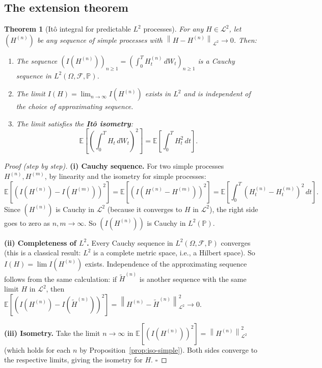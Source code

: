 \documentclass[11pt,a4paper]{article}
\theoremstyle{definition}
\theoremstyle{plain}
\newtheorem{theorem}{Theorem}[section]
\theoremstyle{remark}
\newcommand{\E}{\mathbb{E}}
\newcommand{\Prob}{\mathbb{P}}
\newcommand{\F}{\mathcal{F}}
\newcommand{\calL}{\mathcal{L}}
\newcommand{\norm}[1]{\left\|#1\right\|}
\begin{document}
\subsection{The extension theorem}

\begin{theorem}[Itô integral for predictable $L^2$ processes]
\label{thm:main-extension}
For any $H \in \calL^2$, let $(H^{(n)})$ be any sequence of simple processes with $\norm{H - H^{(n)}}_{\calL^2} \to 0$. Then:
\begin{enumerate}[label=(\roman*)]
  \item The sequence $\left(I(H^{(n)})\right)_{n\geq 1} = \left(\int_0^T H_t^{(n)}\,dW_t\right)_{n\geq 1}$ is a Cauchy sequence in $L^2(\Omega, \F, \Prob)$.
  \item The limit $I(H) = \lim_{n\to\infty} I(H^{(n)})$ exists in $L^2$ and is independent of the choice of approximating sequence.
  \item The limit satisfies the \textbf{Itô isometry}:
  \[
    \E\left[\left(\int_0^T H_t\,dW_t\right)^2\right] = \E\left[\int_0^T H_t^2\,dt\right].
  \]
\end{enumerate}
\end{theorem}

\begin{proof}[Proof (step by step)]
\textbf{(i) Cauchy sequence.}
For two simple processes $H^{(n)}, H^{(m)}$, by linearity and the isometry for simple processes:
\[
  \E\left[\left(I(H^{(n)}) - I(H^{(m)})\right)^2\right] = \E\left[\left(I(H^{(n)} - H^{(m)})\right)^2\right] = \E\left[\int_0^T (H_t^{(n)} - H_t^{(m)})^2\,dt\right].
\]
Since $(H^{(n)})$ is Cauchy in $\calL^2$ (because it converges to $H$ in $\calL^2$), the right side goes to zero as $n, m \to \infty$. So $(I(H^{(n)}))$ is Cauchy in $L^2(\Prob)$.

\textbf{(ii) Completeness of $L^2$.}
Every Cauchy sequence in $L^2(\Omega, \F, \Prob)$ converges (this is a classical result: $L^2$ is a complete metric space, i.e., a Hilbert space). So $I(H) = \lim I(H^{(n)})$ exists. Independence of the approximating sequence follows from the same calculation: if $\tilde{H}^{(n)}$ is another sequence with the same limit $H$ in $\calL^2$, then $\E[(I(H^{(n)}) - I(\tilde{H}^{(n)}))^2] = \norm{H^{(n)} - \tilde{H}^{(n)}}_{\calL^2}^2 \to 0$.

\textbf{(iii) Isometry.}
Take the limit $n \to \infty$ in $\E[(I(H^{(n)}))^2] = \norm{H^{(n)}}_{\calL^2}^2$ (which holds for each $n$ by Proposition~\ref{prop:iso-simple}). Both sides converge to the respective limits, giving the isometry for $H$. $\square$
\end{proof}
\end{document}
